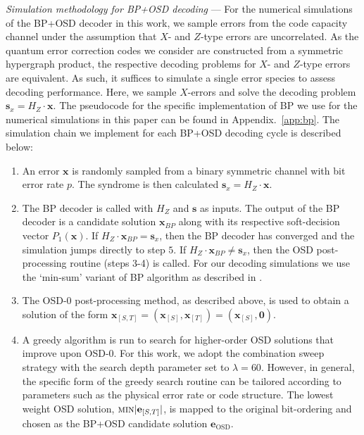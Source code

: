 \documentclass[%
 reprint,
superscriptaddress,
nofootinbib,
 amsmath,amssymb,
secnumarabic
]{revtex4-1}
\begin{document}
\textit{Simulation methodology for BP+OSD decoding} --- For the numerical simulations of the BP+OSD decoder in this work, we sample errors from the code capacity channel under the assumption that $X$- and $Z$-type errors are uncorrelated. As the quantum error correction codes we consider are constructed from a symmetric hypergraph product, the respective decoding problems for $X$- and $Z$-type errors are equivalent. As such, it suffices to simulate a single error species to assess decoding performance. Here, we sample $X$-errors and solve the decoding problem $\mathbf{s}_x=H_Z \cdot \mathbf{x}$. The pseudocode for the specific implementation of BP we use for the numerical simulations in this paper can be found in Appendix.~\ref{app:bp}. The simulation chain we implement for each BP+OSD decoding cycle is described below:
\begin{enumerate}
	\item An error $\mathbf{x}$ is randomly sampled from a binary symmetric channel with bit error rate $p$. The syndrome is then calculated $\mathbf{s}_x=H_Z\cdot \mathbf{x}$.
	
	\item The BP decoder is called with $H_Z$ and $\mathbf{s}$ as inputs. The output of the BP decoder is a candidate solution $\mathbf{x}_{BP}$ along with its respective soft-decision vector $P_1(\mathbf{x})$. If $H_Z\cdot \mathbf{x}_{BP} = \mathbf{s}_x$, then the BP decoder has converged and the simulation jumps directly to step $5$. If $H_Z\cdot \mathbf{x}_{BP} \neq \mathbf{s}_x$, then the OSD post-processing routine (steps 3-4) is called. For our decoding simulations we use the `min-sum' variant of BP algorithm as described in \cite{emran2014simplified}.
	
	\item The OSD-0 post-processing method, as described above, is used to obtain a solution of the form $\mathbf{x}_{[S,T]} = \left(\mathbf{x}_{[S]},\mathbf{x}_{[T]}\right)=\left(\mathbf{x}_{[S]},\mathbf{0}\right)$.
	
	\item A greedy algorithm is run to search for higher-order OSD solutions that improve upon OSD-0. For this work, we adopt the combination sweep strategy with the search depth parameter set to $\lambda=60$. However, in general, the specific form of the greedy search routine can be tailored according to parameters such as the physical error rate or code structure. The lowest weight OSD solution, $\text{\sc{min}}|\mathbf{e}_{[S,T]}|$, is mapped to the original bit-ordering and chosen as the BP+OSD candidate solution $\mathbf{e}_{\text{OSD}}$.
	

\end{enumerate}
\end{document}
